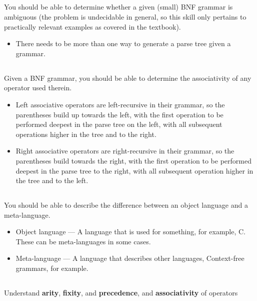 \subsection{}
You should be able to determine whether a given (small) BNF grammar is ambiguous (the problem is undecidable in general, so this skill only pertains to practically relevant examples as covered in the textbook).

\begin{itemize}[noitemsep]
\item There needs to be more than one way to generate a parse tree given a grammar.
\end{itemize}

\subsection{}
Given a BNF grammar, you should be able to determine the associativity of any operator used therein.

\begin{itemize}[noitemsep]
\item Left associative operators are left-recursive in their grammar, so the parentheses build up towards the left, with the first operation to be performed deepest in the parse tree on the left, with all subsequent operations higher in the tree and to the right.
\item Right associative operators are right-recursive in their grammar, so the parentheses build towards the right, with the first operation to be performed deepest in the parse tree to the right, with all subsequent operation higher in the tree and to the left.
\end{itemize}

\subsection{}
You should be able to describe the difference between an object language and a meta-language.

\begin{itemize}
\item Object language --- A language that is used for something, for example, C. These can be meta-languages in some cases.
\item Meta-language --- A language that describes other languages, Context-free grammars, for example.
\end{itemize}

\subsection{}
Understand \textbf{arity}, \textbf{fixity}, and \textbf{precedence}, and \textbf{associativity} of operators

